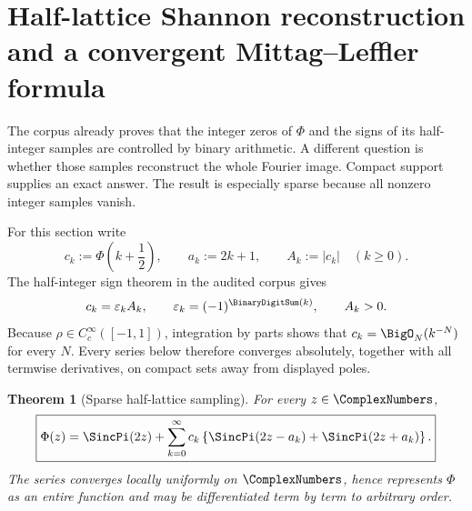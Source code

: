 \documentclass[11pt]{article}
\newtheorem{theorem}{Theorem}[section]
\theoremstyle{definition}
\theoremstyle{remark}
\newcommand{\eps}{\varepsilon}
\begin{document}

\section{Half-lattice Shannon reconstruction and a convergent Mittag--Leffler formula}
\label{p6:sec:half-lattice-sampling}

The corpus already proves that the integer zeros of \(\Phi\) and the signs of its
half-integer samples are controlled by binary arithmetic.  A different question is whether
those samples reconstruct the whole Fourier image.  Compact support supplies an exact
answer.  The result is especially sparse because all nonzero integer samples vanish.

For this section write
\begin{equation}
 c_k:=\Phi\!\left(k+\frac12\right),\qquad a_k:=2k+1,
 \qquad A_k:=|c_k| \quad(k\ge0).                         \label{p6:eq:ck-def}
\end{equation}
The half-integer sign theorem in the audited corpus gives
\begin{equation}
 c_k=\eps_kA_k,
 \qquad \eps_k=(-1)^{\BinaryDigitSum(k)},
 \qquad A_k>0.                                            \label{p6:eq:ck-sign}
\end{equation}
Because \(\rho\in C_c^\infty([-1,1])\), integration by parts shows that
\(c_k=\BigO_N(k^{-N})\) for every \(N\).  Every series below therefore converges
absolutely, together with all termwise derivatives, on compact sets away from displayed
poles.

\begin{theorem}[Sparse half-lattice sampling]
\label{p6:thm:sparse-shannon}
For every \(z\in\ComplexNumbers\),
\begin{equation}
\boxed{
 \Phi(z)=\SincPi(2z)
 +\sum_{k=0}^{\infty}c_k
 \left\{
   \SincPi(2z-a_k)+\SincPi(2z+a_k)
 \right\}.}                                               \label{p6:eq:sparse-shannon}
\end{equation}
The series converges locally uniformly on \(\ComplexNumbers\), hence represents \(\Phi\) as an
entire function and may be differentiated term by term to arbitrary order.
\end{theorem}
\end{document}

